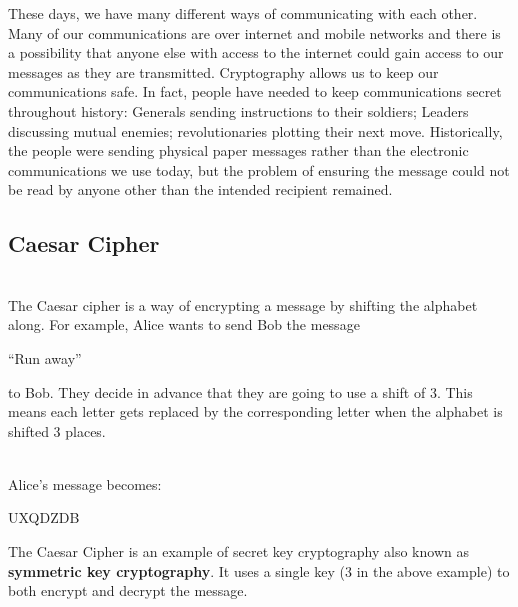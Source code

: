\documentclass[12pt]{amsart}
\theoremstyle{definition}
\theoremstyle{definition}
\theoremstyle{remark}
\begin{document}
These days, we have many different ways of communicating with each other. Many of our communications are over internet and mobile networks and there is a possibility that anyone else with access to the internet could gain access to our messages as they are transmitted. Cryptography allows us to keep our communications safe.
In fact, people have needed to keep communications secret throughout history: Generals sending instructions to their soldiers; Leaders discussing mutual enemies; revolutionaries plotting their next move. Historically, the people were sending physical paper messages rather than the electronic communications we use today, but the problem of ensuring the message could not be read by anyone other than the intended recipient remained.

\subsection*{Caesar Cipher}
\hfill \\

The Caesar cipher is a way of encrypting a message by shifting the alphabet along. For example, Alice wants to send Bob the message 
\begin{center}
``Run away''
\end{center}
to Bob. They decide in advance that they are going to use a shift of 3. This means each letter gets replaced by the corresponding letter when the alphabet is shifted 3 places.
\hfill \\

\begin{center}
\end{center}
\hfill \\

Alice's message becomes:
\begin{center}
UXQDZDB
\end{center}


The Caesar Cipher is an example of secret key cryptography also known as \textbf{symmetric key cryptography}. It uses a single key (3 in the above example) to both encrypt and decrypt the message.
\end{document}
